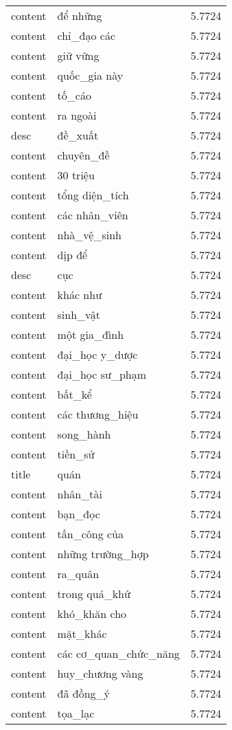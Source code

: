 \documentclass{article}
\begin{document}
\begin{tabular}{lll}
content & để những & 5.7724\\
content & chỉ\_đạo các & 5.7724\\
content & giữ vững & 5.7724\\
content & quốc\_gia này & 5.7724\\
content & tố\_cáo & 5.7724\\
content & ra ngoài & 5.7724\\
desc & đề\_xuất & 5.7724\\
content & chuyên\_đề & 5.7724\\
content & 30 triệu & 5.7724\\
content & tổng diện\_tích & 5.7724\\
content & các nhân\_viên & 5.7724\\
content & nhà\_vệ\_sinh & 5.7724\\
content & dịp để & 5.7724\\
desc & cục & 5.7724\\
content & khác như & 5.7724\\
content & sinh\_vật & 5.7724\\
content & một gia\_đình & 5.7724\\
content & đại\_học y\_dược & 5.7724\\
content & đại\_học sư\_phạm & 5.7724\\
content & bất\_kể & 5.7724\\
content & các thương\_hiệu & 5.7724\\
content & song\_hành & 5.7724\\
content & tiền\_sử & 5.7724\\
title & quán & 5.7724\\
content & nhân\_tài & 5.7724\\
content & bạn\_đọc & 5.7724\\
content & tấn\_công của & 5.7724\\
content & những trường\_hợp & 5.7724\\
content & ra\_quân & 5.7724\\
content & trong quá\_khứ & 5.7724\\
content & khó\_khăn cho & 5.7724\\
content & mặt\_khác & 5.7724\\
content & các cơ\_quan\_chức\_năng & 5.7724\\
content & huy\_chương vàng & 5.7724\\
content & đã đồng\_ý & 5.7724\\
content & tọa\_lạc & 5.7724\\

\end{tabular}
\end{document}
